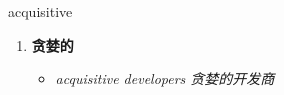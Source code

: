
\begin{frame}
{\huge acquisitive}
\begin{center}
\begin{enumerate}\Large
  \item \textbf{贪婪的}
  \begin{itemize}
    \item \em{\Large{acquisitive developers 贪婪的开发商}}
  \end{itemize}
\end{enumerate}
\end{center}
\end{frame}
